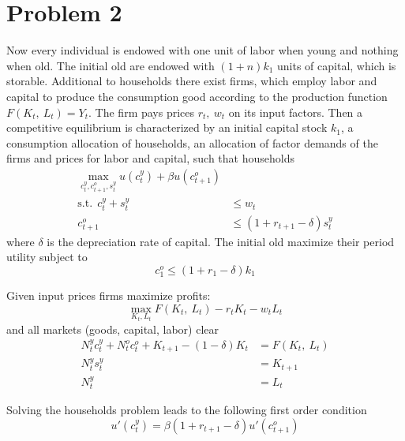 
\section*{Problem 2}

Now every individual is endowed with one unit of labor when young and nothing
when old. The initial old are endowed with $(1 + n) k_1$ units of capital,
which is storable. Additional to households there exist firms, which employ
labor and capital to produce the consumption good according to the production
function $F(K_t,~L_t) = Y_t$. The firm pays prices $r_t,~w_t$ on its input
factors. Then a competitive equilibrium is characterized by an initial capital
stock $k_1$, a consumption allocation of households, an allocation of factor
demands of the firms and prices for labor and capital, such that households
\begin{align*}
  \max_{c_t^y, c_{t+1}^o, s_t^y}  u(c_t^y) + \beta u(c_{t+1}^o) \\
  \text{s.t.}~~c_t^y + s_t^y &\leq w_t \\
  c_{t+1}^o &\leq (1 + r_{t+1} - \delta) s_t^y
\end{align*}
where $\delta$ is the depreciation rate of capital. The initial old maximize
their period utility subject to
\begin{equation*}
  c_1^o \leq (1 + r_1 - \delta) k_1
\end{equation*}

Given input prices firms maximize profits:
\begin{equation*}
  \max_{K_t,L_t} F(K_t,~L_t) - r_t K_t - w_t L_t
\end{equation*}
and all markets (goods, capital, labor) clear
\begin{align*}
  N_t^y c_t^y + N_t^o c_t^o + K_{t+1} - (1 - \delta) K_t &= F(K_t,~L_t) \\
  N_t^y s_t^y &= K_{t+1} \\
  N_t^y &= L_t
\end{align*}

Solving the households problem leads to the following first order condition
\begin{equation*}
  u'(c_t^y) = \beta (1 + r_{t+1} - \delta) u'(c_{t+1}^o)
\end{equation*}

